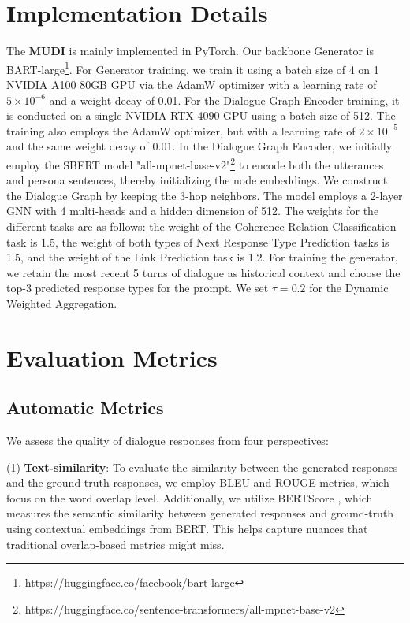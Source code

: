 \section{Implementation Details}
The \textbf{MUDI} is mainly implemented in PyTorch. Our backbone Generator is BART-large\footnote[2]{https://huggingface.co/facebook/bart-large}. For Generator training, we train it using a batch size of 4 on 1 NVIDIA A100 80GB
GPU via the AdamW optimizer with a learning rate of \(5 \times 10^{-6}\) and a
weight decay of 0.01. For the Dialogue Graph Encoder training, it is conducted on a single NVIDIA RTX 4090 GPU using a batch size of 512. The training also employs the AdamW optimizer, but with a learning rate of \(2 \times 10^{-5}\) and the same weight decay of 0.01. In the Dialogue Graph Encoder, we initially employ the SBERT model "all-mpnet-base-v2"\footnote[3]{https://huggingface.co/sentence-transformers/all-mpnet-base-v2} to encode both the utterances and persona sentences, thereby initializing the node embeddings. We construct the Dialogue Graph by keeping the 3-hop neighbors. The model employs a 2-layer GNN with 4 multi-heads and a hidden dimension of 512. The weights for the different tasks are as follows: the weight of the Coherence Relation Classification task is 1.5, the weight of both types of Next Response Type Prediction tasks is 1.5, and the weight of the Link Prediction task is 1.2. For training the generator, we retain the most recent 5 turns of dialogue as historical context and choose the top-3 predicted response types for the prompt. We set \(\tau = 0.2\) for the Dynamic Weighted Aggregation.


\section{Evaluation Metrics}
\subsection{Automatic Metrics}
We assess the quality of dialogue responses from four perspectives: 

(1) \textbf{Text-similarity}: To evaluate the similarity between the generated responses and the ground-truth responses, we employ BLEU \cite{papineni-etal-2002-bleu} and ROUGE \cite{lin-2004-rouge} metrics, which focus on the word overlap level. Additionally, we utilize BERTScore \cite{zhang-etal-2020-bert-score}, which measures the semantic similarity between generated responses and ground-truth using contextual embeddings from BERT. This helps capture nuances that traditional overlap-based metrics might miss.

